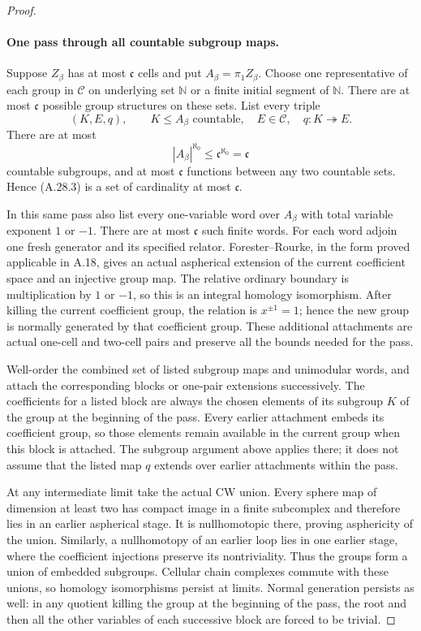 \begin{proof}
\paragraph{One pass through all countable subgroup maps.}
Suppose $Z_\beta$ has at most $\mathfrak c$ cells
and put $A_\beta=\pi_1Z_\beta$. Choose one
representative of each group in $\mathcal C$ on
underlying set $\mathbb N$ or a finite initial
segment of $\mathbb N$. There are at most
$\mathfrak c$ possible group structures on these
sets. List every triple
\[
 (K,E,q),\qquad K\leq A_\beta\text{ countable},
 \quad E\in\mathcal C,
 \quad q:K\twoheadrightarrow E.
 \tag{A.28.3}
\]
There are at most
\[
 |A_\beta|^{\aleph_0}\leq
 \mathfrak c^{\aleph_0}=\mathfrak c
 \tag{A.28.4}
\]
countable subgroups, and at most $\mathfrak c$
functions between any two countable sets. Hence
(A.28.3) is a set of cardinality at most
$\mathfrak c$.

In this same pass also list every one-variable
word over $A_\beta$ with total variable exponent
$1$ or $-1$. There are at most $\mathfrak c$
such finite words. For each word adjoin one
fresh generator and its specified relator.
Forester--Rourke, in the form proved applicable
in A.18, gives an actual aspherical extension
of the current coefficient space and an
injective group map. The relative ordinary
boundary is multiplication by $1$ or $-1$,
so this is an integral homology isomorphism.
After killing the current coefficient group,
the relation is $x^{\pm1}=1$; hence the new
group is normally generated by that coefficient
group. These additional attachments are actual
one-cell and two-cell pairs and preserve all
the bounds needed for the pass.

Well-order the combined set of listed subgroup
maps and unimodular words, and attach the
corresponding blocks or one-pair extensions
successively.
The coefficients for a listed block are always the
chosen elements of its subgroup $K$ of the group
at the beginning of the pass. Every earlier
attachment embeds its coefficient group, so those
elements remain available in the current group
when this block is attached. The subgroup argument
above applies there; it does not assume that the
listed map $q$ extends over earlier attachments
within the pass.

At any intermediate limit take the actual CW union.
Every sphere map of dimension at least two has
compact image in a finite subcomplex and therefore
lies in an earlier aspherical stage. It is
nullhomotopic there, proving asphericity of the
union. Similarly, a nullhomotopy of an earlier
loop lies in one earlier stage, where the
coefficient injections preserve its nontriviality.
Thus the groups form a union of embedded subgroups.
Cellular chain complexes commute with these unions,
so homology isomorphisms persist at limits.
Normal generation persists as well: in any quotient
killing the group at the beginning of the pass,
the root and then all the other variables of
each successive block are forced to be trivial.


\end{proof}
